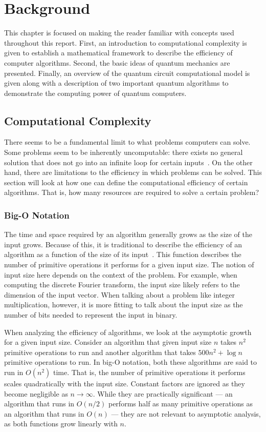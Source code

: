 \chapter{Background} \label{chap:background}
This chapter is focused on making the reader familiar with concepts used throughout this report.
First, an introduction to computational complexity is given to establish a mathematical framework to describe the efficiency of computer algorithms.
Second, the basic ideas of quantum mechanics are presented.
Finally, an overview of the quantum circuit computational model is given along with a description of two important quantum algorithms to demonstrate the computing power of quantum computers.

\section{Computational Complexity}
There seems to be a fundamental limit to what problems computers can solve.
Some problems seem to be inherently uncomputable: there exists no general solution that does not go into an infinite loop for certain inputs~\cite{church1936note, turing1937computable}.
On the other hand, there are limitations to the efficiency in which problems can be solved.
This section will look at how one can define the computational efficiency of certain algorithms.
That is, how many resources are required to solve a certain problem?

\subsection{Big-O Notation}
The time and space required by an algorithm generally grows as the size of the input grows.
Because of this, it is traditional to describe the efficiency of an algorithm as a function of the size of its input~\cite{cormen2009introduction}.
This function describes the number of primitive operations it performs for a given input size.
The notion of input size here depends on the context of the problem.
For example, when computing the discrete Fourier transform, the input size likely refers to the dimension of the input vector.
When talking about a problem like integer multiplication, however, it is more fitting to talk about the input size as the number of bits needed to represent the input in binary.

When analyzing the efficiency of algorithms, we look at the asymptotic growth for a given input size.
Consider an algorithm that given input size $n$ takes $n^2$ primitive operations to run and another algorithm that takes $500n^2 + \log n$ primitive operations to run.
In big-O notation, both these algorithms are said to run in $O(n^2)$ time.
That is, the number of primitive operations it performs scales quadratically with the input size.
Constant factors are ignored as they become negligible as $n \to \infty$.
While they are practically significant --- an algorithm that runs in $O(n/2)$ performs half as many primitive operations as an algorithm that runs in $O(n)$ --- they are not relevant to asymptotic analysis, as both functions grow linearly with $n$. 

